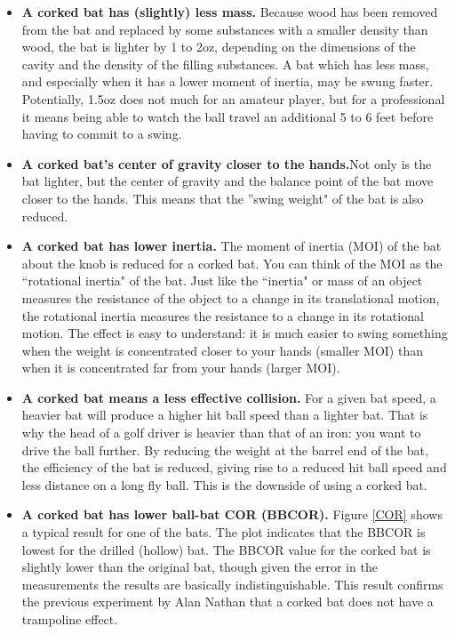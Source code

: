 \begin{itemize}
\item \textbf{A corked bat has (slightly) less mass.} Because wood has been removed from the bat and replaced by some substances with a smaller density than wood, the bat is lighter by 1 to 2oz, depending on the dimensions of the cavity and the density of the filling substances. A bat which has less mass, and especially when it has a lower moment of inertia, may be swung faster. Potentially, 1.5oz does not much for an amateur player, but for a professional it means being able to watch the ball travel an additional 5 to 6 feet before having to commit to a swing.

\item \textbf{A corked bat's center of gravity closer to the hands.}Not only is the bat lighter, but the center of gravity and the balance point of the bat move closer to the hands. This means that the ''swing weight" of the bat is also reduced.

\item \textbf{A corked bat has lower inertia.} The moment of inertia (MOI) of the bat about the knob is reduced for a corked bat. You can think of the MOI as the ``rotational inertia" of the bat. Just like the ``inertia" or mass of an object measures the resistance of the object to a change in its translational motion, the rotational inertia measures the resistance to a change in its rotational motion. The effect is easy to understand: it is much easier to swing something when the weight is concentrated closer to your hands (smaller MOI) than when it is concentrated far from your hands (larger MOI).

\item \textbf{A corked bat means a less effective collision.} For a given bat speed, a heavier bat will produce a higher hit ball speed than a lighter bat. That is why the head of a golf driver is heavier than that of an iron: you want to drive the ball further. By reducing the weight at the barrel end of the bat, the efficiency of the bat is reduced, giving rise to a reduced hit ball speed and less distance on a long fly ball. This is the downside of using a corked bat.

\item \textbf{A corked bat has lower ball-bat COR (BBCOR).} Figure \ref{COR} shows a typical result for one of the bats. The plot indicates that the BBCOR is lowest for the drilled (hollow) bat. The BBCOR value for the corked bat is slightly lower than the original bat, though given the error in the measurements the results are basically indistinguishable. This result confirms the previous experiment by Alan Nathan that a corked bat does not have a trampoline effect.


\end{itemize}
